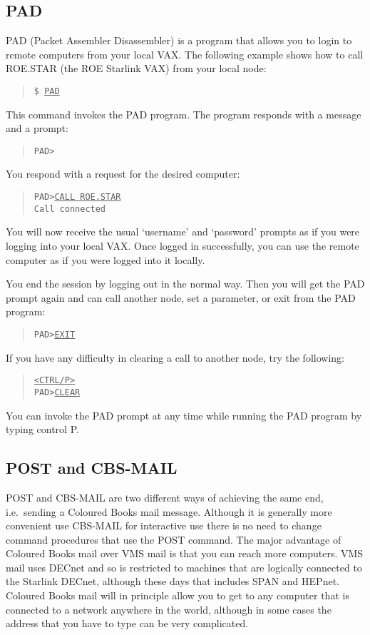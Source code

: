 \subsection{PAD}
PAD (Packet Assembler Disassembler) is a program that allows you to login to
remote computers from your local VAX.
The following example shows how to call ROE.STAR (the ROE Starlink VAX)
from your local node:
\begin{quote}
{\tt \$ \underline{PAD}}
\end{quote}
This command invokes the PAD program.
The program responds with a message and a prompt:
\begin{quote}
{\tt PAD>}
\end{quote}
You respond with a request for the desired computer:
\begin{quote}
{\tt PAD>\underline{CALL ROE.STAR}\\
Call connected}
\end{quote}
You will now receive the usual `username' and `password' prompts as if you were
logging into your local VAX.
Once logged in successfully, you can use the remote computer as if you were
logged into it locally.

You end the session by logging out in the normal way.
Then you will get the PAD prompt again and can call another node, set a
parameter, or exit from the PAD program:
\begin{quote}
{\tt PAD>\underline{EXIT}}
\end{quote}
If you have any difficulty in clearing a call to another node, try the
following:
\begin{quote}
{\tt \underline{<CTRL/P>}\\
PAD>\underline{CLEAR}}
\end{quote}
You can invoke the PAD prompt at any time while running the PAD program
by typing control P.
\subsection{POST and CBS-MAIL}
POST and CBS-MAIL are two different ways of achieving the same end, i.e.\
sending a Coloured Books mail message.
Although it is generally more convenient use CBS-MAIL for interactive use
there is no need to change command procedures that use the POST command.
The major advantage of Coloured Books mail over VMS mail is that you can reach 
more computers. VMS mail uses DECnet and so is restricted to machines that are
logically connected to the Starlink DECnet, although these days that includes
SPAN and HEPnet. Coloured Books mail will in principle allow you to get to any
computer that is connected to a network anywhere in the world, although in some
cases the address that you have to type can be very complicated.

